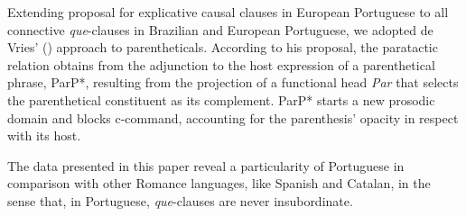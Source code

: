 \documentclass[output=paper,colorlinks,citecolor=brown,
]{langscibook}
\begin{document}
Extending \citet{colaco_explicative_2016} proposal for explicative causal clauses in European Portuguese to all connective \textit{que}-clauses in Brazilian and European Portuguese, we adopted de Vries' (\citeyear{de_vries_unconventional_2012}) approach to parentheticals. According to his proposal, the paratactic relation obtains from the adjunction to the host expression of a parenthetical phrase, ParP*, resulting from the projection of a functional head \textit{Par} that selects the parenthetical constituent as its complement. ParP* starts a new prosodic domain and blocks c-command, accounting for the parenthesis’ opacity in respect with its host.

The data presented in this paper reveal a particularity of Portuguese in comparison with other Romance languages, like Spanish and Catalan, in the sense that, in Portuguese, \textit{que}-clauses are never insubordinate.



\printbibliography[heading=subbibliography,notkeyword=this]
\end{document}
